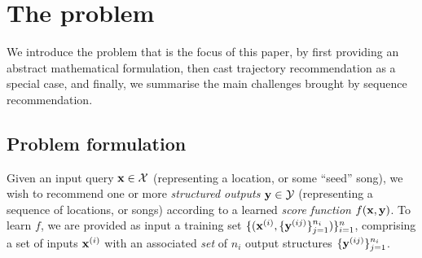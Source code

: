 
\section{The {\seqrec} problem}
\label{sec:recseq}

We introduce the {\seqrec} problem that is the focus of this paper,
by first providing an abstract mathematical formulation, 
then cast trajectory recommendation as a special case,
and finally, we summarise the main challenges brought by sequence recommendation.


\subsection{Problem formulation}

Given an input query $\mathbf{x} \in \mathcal{X}$ (representing \eg a location, or some ``seed'' song),
we wish to recommend one or more \emph{structured outputs} $\mathbf{y} \in \mathcal{Y}$ (representing \eg a sequence of locations, or songs)
according to a learned \emph{score function} $f(\mathbf{x},\mathbf{y})$.
To learn $f$,
we are provided as input a training set
$\{ ( \mathbf{x}^{({i})}, \{ \mathbf{y}^{({ij})} \}_{j=1}^{n_i} ) \}_{i=1}^{n}$,
comprising a set %
of inputs $\mathbf{x}^{({i})}$ with an associated \emph{set} of $n_i$ output structures $\{ \mathbf{y}^{({ij})} \}_{j=1}^{n_i}$.

